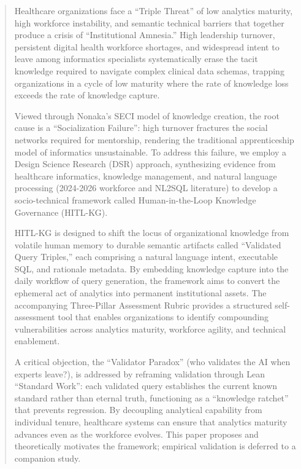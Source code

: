 \documentclass[
  american,
  11pt,
  letterpaper,
  oneside  ,captions=tableheading
]{scrartcl}
\begin{document}
\begin{abstract}
Healthcare organizations face a ``Triple Threat'' of low analytics
maturity, high workforce instability, and semantic technical barriers
that together produce a crisis of ``Institutional Amnesia.'' High
leadership turnover, persistent digital health workforce shortages, and
widespread intent to leave among informatics specialists systematically
erase the tacit knowledge required to navigate complex clinical data
schemas, trapping organizations in a cycle of low maturity where the
rate of knowledge loss exceeds the rate of knowledge capture.

Viewed through Nonaka's SECI model of knowledge creation, the root cause
is a ``Socialization Failure'': high turnover fractures the social
networks required for mentorship, rendering the traditional
apprenticeship model of informatics unsustainable. To address this
failure, we employ a Design Science Research (DSR) approach,
synthesizing evidence from healthcare informatics, knowledge management,
and natural language processing (2024-2026 workforce and NL2SQL
literature) to develop a socio-technical framework called
Human-in-the-Loop Knowledge Governance (HITL-KG).

HITL-KG is designed to shift the locus of organizational knowledge from
volatile human memory to durable semantic artifacts called ``Validated
Query Triples,'' each comprising a natural language intent, executable
SQL, and rationale metadata. By embedding knowledge capture into the
daily workflow of query generation, the framework aims to convert the
ephemeral act of analytics into permanent institutional assets. The
accompanying Three-Pillar Assessment Rubric provides a structured
self-assessment tool that enables organizations to identify compounding
vulnerabilities across analytics maturity, workforce agility, and
technical enablement.

A critical objection, the ``Validator Paradox'' (who validates the AI
when experts leave?), is addressed by reframing validation through Lean
``Standard Work'': each validated query establishes the current known
standard rather than eternal truth, functioning as a ``knowledge
ratchet'' that prevents regression. By decoupling analytical capability
from individual tenure, healthcare systems can ensure that analytics
maturity advances even as the workforce evolves. This paper proposes and
theoretically motivates the framework; empirical validation is deferred
to a companion study.
\end{abstract}
\end{document}
